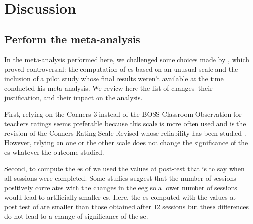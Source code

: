 


\section{Discussion}

\subsection{Perform the meta-analysis}
In the meta-analysis performed here, we challenged some choices made by \citeauthor{Cortese2016}, 
which proved controversial: the computation of \gls{es} based on an unusual scale \citep{Steiner2014} and the inclusion 
of a pilot study \citep{Arnold2014} whose final results weren't available at the time \citeauthor{Cortese2016} 
conducted his meta-analysis. We review here the list of changes, their justification, and their impact on the analysis.
 
First, relying on the Conners-3 \citep{Conners2008} instead of the BOSS Classroom Observation \citep{Shapiro2010} 
for teachers ratings seems preferable because this scale is more often used \citep{Christiansen2014, 
Bluschke2016} and is the revision of the Conners Rating Scale Revised \citep{Conners1998} whose reliability has been studied 
\citep{Collett2003}. However, relying on one or the other scale does not 
change the significance of the \gls{es} whatever the outcome studied.

Second, to compute the \gls{es} of \citet{Arnold2014} we used the values at post-test
that is to say when all sessions were completed. Some studies suggest that the number of sessions positively 
correlates with the changes in the \gls{eeg} \citep{Vernon2004} so a lower number of sessions would lead to 
artificially smaller \gls{es}. Here, the \gls{es} computed with the values at post test of \citet{Arnold2014} 
are smaller than those obtained after 12 sessions but these differences do not lead to a change of significance 
of the \gls{se}. 

